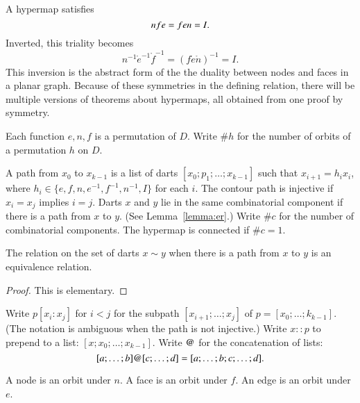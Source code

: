 A hypermap satisfies 
  \begin{equation}\tlabel{eqn:triality}
  n\ocirc f\ocirc e = f\ocirc e\ocirc n = I.
  \end{equation}
Inverted, this triality becomes
   $$
   n^{-1} \ocirc e^{-1} \ocirc f^{-1} = (f \ocirc e \ocirc n)^{-1} = I.
   $$
This inversion is the abstract form of the the duality between nodes and faces in a planar graph.  Because of these symmetries in the defining relation, there will be multiple versions of theorems about hypermaps, all obtained from one proof by symmetry.

Each function $e,n,f$ is a permutation of $D$.  Write $\#h$ for the number of orbits of a permutation $h$ on $D$.


\begin{definition}  A path from $x_0$ to $x_{k-1}$ is a list of darts $[x_0;p_1;\ldots;x_{k-1}]$ such that $x_{i+1} = h_i x_i$, where $h_i \in \{e,f,n,e^{-1},f^{-1},n^{-1},I\}$ for each $i$.   The contour path is injective if $x_i=x_j$ implies $i=j$. Darts $x$ and $y$ lie in the same combinatorial component if there is a path from $x$ to $y$. (See Lemma~\ref{lemma:er}.)  Write $\#c$ for the number of combinatorial components.  The hypermap is connected if $\#c=1$.
\end{definition}

\begin{lemma}\label{lemma:er} The relation on the set of darts $x\sim y$ when there is a path from $x$ to $y$ is an equivalence relation.
\end{lemma}

\begin{proof} This is elementary.
\end{proof}

Write  $p[x_i:x_j]$ for $i<j$ for the subpath $[x_{i+1};\ldots;x_j]$ of $p=[x_0;\ldots;k_{k-1}]$.  (The notation is ambiguous when the path is not injective.)  Write $x::p$ to prepend to a list: $[x;x_0;\ldots;x_{k-1}]$.  Write ${\operatorname{@}}$ for the concatenation of lists:
$$
[a;\ldots;b] {\operatorname{@}} [c;\ldots;d]  = [a;\ldots;b;c;\ldots;d].
$$


\begin{definition}  A node is an orbit  under $n$.  A face is an  orbit  under $f$.  An edge is an orbit under $e$. 
\end{definition}

